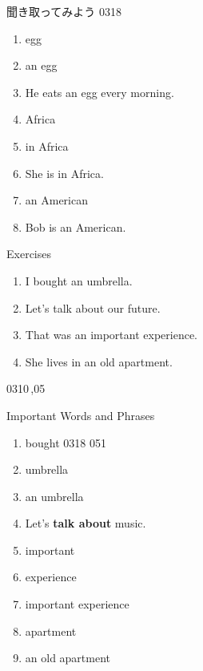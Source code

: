 \documentclass[aspectratio=169,xcolor={dvipsnames,table}]{beamer}
\begin{document}
\begin{frame}[plain]{聞き取ってみよう}
  \Large
  \hfill{\tiny 0318}\,{\scriptsize {}}

  \begin{enumerate}\setlength{\itemsep}{-1pt}
    \item<2-> egg
    \item<3-> an egg
    \item<4-> He eats an egg every morning.
    \item<5-> Africa
    \item<6-> in Africa
    \item<7-> She is in Africa.
    \item<8-> an American
    \item<9-> Bob is an American.
  \end{enumerate}

\end{frame}
\begin{frame}[plain]{Exercises}
  \Large
  \begin{enumerate}
    \item I bought \only<2->{\textcolor{Maroon}{\textbottomtiebar\ }} an  umbrella.
    \item Let's talk \only<4->{\textcolor{Maroon}{\textbottomtiebar\ }} about  our future.
    \item That was \only<6->{\textcolor{Maroon}{\textbottomtiebar\ }} an  important  experience.
    \item She lives \only<9->{\textcolor{Maroon}{\textbottomtiebar\ }} in  an  old   apartment.
  \end{enumerate}

  \hfill{\tiny 0310}\,{\tiny{},05}
\end{frame}
\begin{frame}[plain]{Important Words and Phrases}
  \Large
  \begin{enumerate}\setlength{\itemsep}{-1pt}
    \item bought
          \hfill{\tiny 0318}\,{\tiny{}\,051}
    \item umbrella
    \item an umbrella
    \item Let's \textbf{talk about} music.
    \item important
    \item experience
    \item important experience
    \item apartment
    \item an old apartment
  \end{enumerate}

\end{frame}
\end{document}

